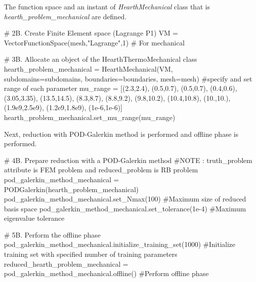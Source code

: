 The function space and an instant of \emph{HearthMechanical} class that is \emph{hearth\_problem\_mechanical} are defined. 
\begin{python}
# 2B. Create Finite Element space (Lagrange P1)
VM = VectorFunctionSpace(mesh,"Lagrange",1) # For mechanical

# 3B. Allocate an object of the HearthThermoMechanical class
hearth_problem_mechanical = HearthMechanical(VM, subdomains=subdomains, boundaries=boundaries, mesh=mesh)
#specify and set range of each parameter
mu_range = [(2.3,2.4), (0.5,0.7), (0.5,0.7), (0.4,0.6), (3.05,3.35), (13.5,14.5), (8.3,8.7), (8.8,9.2), (9.8,10.2), (10.4,10.8), (10.,10.), (1.9e9,2.5e9), (1.2e9,1.8e9), (1e-6,1e-6)]
hearth_problem_mechanical.set_mu_range(mu_range)
\end{python}

Next, reduction with POD-Galerkin method is performed and offline phase is performed.
\begin{python}
# 4B. Prepare reduction with a POD-Galerkin method
#NOTE : truth_problem attribute is FEM problem and reduced_problem is RB problem
pod_galerkin_method_mechanical = PODGalerkin(hearth_problem_mechanical)
pod_galerkin_method_mechanical.set_Nmax(100) #Maximum size of reduced basis space
pod_galerkin_method_mechanical.set_tolerance(1e-4) #Maximum eigenvalue tolerance

# 5B. Perform the offline phase
pod_galerkin_method_mechanical.initialize_training_set(1000) #Initialize training set with specified number of training parameters
reduced_hearth_problem_mechanical = pod_galerkin_method_mechanical.offline() #Perform offline phase
\end{python}

